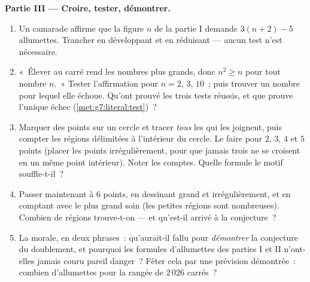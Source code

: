 \begin{problem}
\medskip
\noindent\textbf{Partie III --- Croire, tester, démontrer.}
\begin{enumerate}[resume]
  \item Un camarade affirme que la figure $n$ de la partie I demande
        $3(n + 2) - 5$ allumettes. Trancher en développant et en
        réduisant --- aucun test n'est nécessaire.
  \item «~Élever au carré rend les nombres plus grands, donc
        $n^2 \geq n$ pour tout nombre $n$.~» Tester l'affirmation
        pour $n = 2$, $3$, $10$~; puis trouver un nombre pour lequel
        elle échoue. Qu'ont prouvé les trois tests réussis, et que
        prouve l'unique échec (\cref{met:g7:literal:test})~?
  \item Marquer des points sur un cercle et tracer \emph{tous} les
         qui les joignent, puis compter les régions
        délimitées à l'intérieur du cercle. Le faire pour $2$, $3$,
        $4$ et $5$ points (placer les points irrégulièrement, pour
        que jamais trois  ne se croisent en un même point
        intérieur). Noter les comptes. Quelle formule le motif
        souffle-t-il~?
  \item Passer maintenant à $6$ points, en dessinant grand et
        irrégulièrement, et en comptant avec le plus grand soin (les
        petites régions sont nombreuses). Combien de régions
        trouve-t-on --- et qu'est-il arrivé à la conjecture~?
  \item La morale, en deux phrases~: qu'aurait-il fallu pour
        \emph{démontrer} la conjecture du doublement, et pourquoi
        les formules d'allumettes des parties I et II n'ont-elles
        jamais couru pareil danger~? Fêter cela par une prévision
        démontrée~: combien d'allumettes pour la rangée de $2\,026$
        carrés~?
\end{enumerate}
\end{problem}
